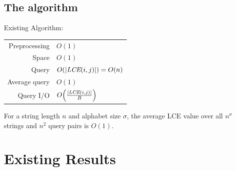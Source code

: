 \documentclass{beamer}
\begin{document}
\subsection{The  algorithm}
\begin{frame}{Existing Algorithm: }
    \begin{tabular}{r l}
        Preprocessing & $O(1)$ \\
        Space & $O(1)$ \\
        Query & $O(|\textit{LCE}(i,j)|)=O(n)$ \\
        Average query & $O(1)$ \\
        Query I/O & $O\Big(\frac{|\textit{LCE}(i,j)|}{B}\Big)$ \\
    \end{tabular}

    \vspace{1cm}
    For a string length $n$ and alphabet size $\sigma$, the average LCE value over all $n^\sigma$ strings and $n^2$ query pairs is $O(1)$.
\end{frame}

\section{Existing Results}
\end{document}
